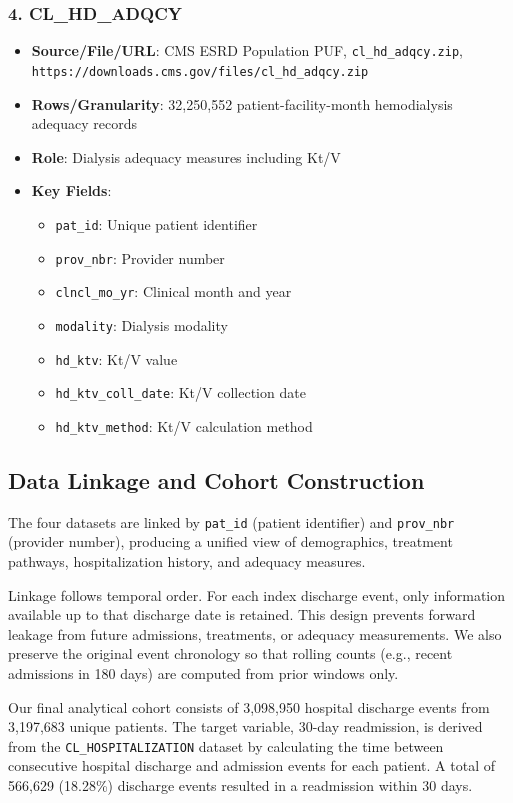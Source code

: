 \documentclass[conference]{IEEEtran}
\begin{document}
\subsubsection{4. CL_HD_ADQCY}
\begin{itemize}
    \item \textbf{Source/File/URL}: CMS ESRD Population PUF, \texttt{cl_hd_adqcy.zip}, \texttt{https://downloads.cms.gov/files/cl_hd_adqcy.zip}
    \item \textbf{Rows/Granularity}: 32,250,552 patient-facility-month hemodialysis adequacy records
    \item \textbf{Role}: Dialysis adequacy measures including Kt/V
    \item \textbf{Key Fields}:
    \begin{itemize}
        \item \texttt{pat_id}: Unique patient identifier
        \item \texttt{prov_nbr}: Provider number
        \item \texttt{clncl_mo_yr}: Clinical month and year
        \item \texttt{modality}: Dialysis modality
        \item \texttt{hd_ktv}: Kt/V value
        \item \texttt{hd_ktv_coll_date}: Kt/V collection date
        \item \texttt{hd_ktv_method}: Kt/V calculation method
    \end{itemize}
\end{itemize}

\subsection{Data Linkage and Cohort Construction}
The four datasets are linked by \texttt{pat_id} (patient identifier) and \texttt{prov_nbr} (provider number), producing a unified view of demographics, treatment pathways, hospitalization history, and adequacy measures.

Linkage follows temporal order. For each index discharge event, only information available up to that discharge date is retained. This design prevents forward leakage from future admissions, treatments, or adequacy measurements. We also preserve the original event chronology so that rolling counts (e.g., recent admissions in 180 days) are computed from prior windows only.

Our final analytical cohort consists of 3,098,950 hospital discharge events from 3,197,683 unique patients. The target variable, 30-day readmission, is derived from the \texttt{CL_HOSPITALIZATION} dataset by calculating the time between consecutive hospital discharge and admission events for each patient. A total of 566,629 (18.28\%) discharge events resulted in a readmission within 30 days.
\end{document}
